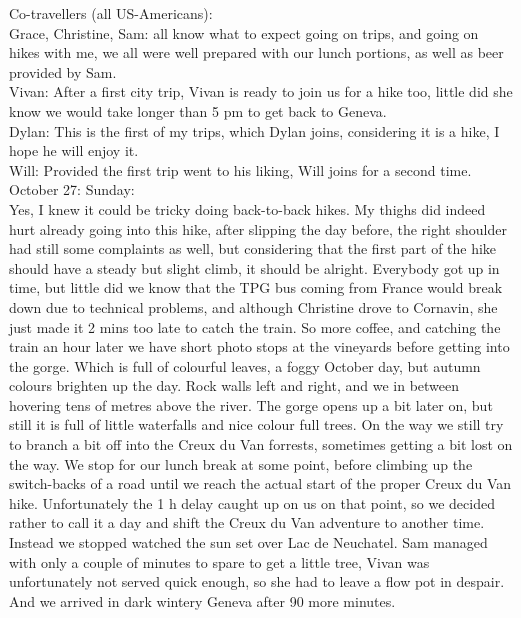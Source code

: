 Co-travellers (all US-Americans):\\
Grace, Christine, Sam: all know what to expect going on trips, and going on hikes with me, we all were well prepared with our lunch portions, as well as beer provided by Sam.\\

Vivan: After a first city trip, Vivan is ready to join us for a hike too, little did she know we would take longer than 5 pm to get back to Geneva.\\

Dylan: This is the first of my trips, which Dylan joins, considering it is a hike, I hope he will enjoy it.\\

Will: Provided the first trip went to his liking, Will joins for a second time.\\

October 27: Sunday:\\
Yes, I knew it could be tricky doing back-to-back hikes. My thighs did indeed hurt already going into this hike, after slipping the day before, the right shoulder had still some complaints as well, but considering that the first part of the hike should have a steady but slight climb, it should be alright. Everybody got up in time, but little did we know that the TPG bus coming from France would break down due to technical problems, and although Christine drove to Cornavin, she just made it 2 mins too late to catch the train. So more coffee, and catching the train an hour later we have short photo stops at the vineyards before getting into the gorge. Which is full of colourful leaves, a foggy October day, but autumn colours brighten up the day. Rock walls left and right, and we in between hovering tens of metres above the river. The gorge opens up a bit later on, but still it is full of little waterfalls and nice colour full trees. On the way we still try to branch a bit off into the Creux du Van forrests, sometimes getting a bit lost on the way. We stop for our lunch break at some point, before climbing up the switch-backs of a road until we reach the actual start of the proper Creux du Van hike. Unfortunately the 1 h delay caught up on us on that point, so we decided rather to call it a day and shift the Creux du Van adventure to another time. Instead we stopped watched the sun set over Lac de Neuchatel. Sam managed with only a couple of minutes to spare to get a little tree, Vivan was unfortunately not served quick enough, so she had to leave a flow pot in despair. And we arrived in dark wintery Geneva after 90 more minutes.\\

